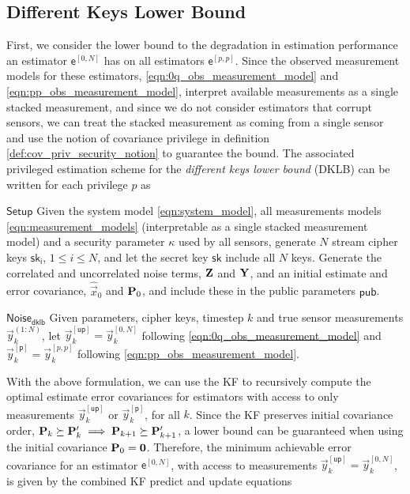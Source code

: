 \documentclass[conference]{IEEEtran}
\theoremstyle{definition}
\theoremstyle{remark}
\begin{document}
\subsection{Different Keys Lower Bound}\label{subsec:crypto_different_keys_lower_bound}
First, we consider the lower bound to the degradation in estimation performance an estimator $\mathsf{e}^{[0,N]}$ has on all estimators $\mathsf{e}^{[p,p]}$. Since the observed measurement models for these estimators, \eqref{eqn:0q_obs_measurement_model} and \eqref{eqn:pp_obs_measurement_model}, interpret available measurements as a single stacked measurement, and since we do not consider estimators that corrupt sensors, we can treat the stacked measurement as coming from a single sensor and use the notion of covariance privilege in definition \ref{def:cov_priv_security_notion} to guarantee the bound. The associated privileged estimation scheme for the \textit{different keys lower bound} (DKLB) can be written for each privilege $p$ as
\begin{LaTeXdescription}
  \item[$\mathsf{Setup}$] Given the system model \eqref{eqn:system_model}, all measurements models \eqref{eqn:measurement_models} (interpretable as a single stacked measurement model) and a security parameter $\kappa$ used by all sensors, generate $N$ stream cipher keys $\mathsf{sk_i}$, $1\leq i \leq N$, and let the secret key $\mathsf{sk}$ include all $N$ keys. Generate the correlated and uncorrelated noise terms, ${{\mathbf{Z}}}$ and ${{\mathbf{Y}}}$, and an initial estimate and error covariance, $\hat{\vec{x}}_0$ and ${{\mathbf{P}}}_0$, and include these in the public parameters $\mathsf{pub}$.
  
  \item[$\mathsf{Noise}_{\mathsf{dklb}}$] Given parameters, cipher keys, timestep $k$ and true sensor measurements $\vec{y}_k^{(1:N)}$, let $\vec{y}_k^{[\mathsf{up}]}=\vec{y}_k^{[0,N]}$ following \eqref{eqn:0q_obs_measurement_model} and $\vec{y}_k^{[\mathsf{p}]}=\vec{y}_k^{[p,p]}$ following \eqref{eqn:pp_obs_measurement_model}.
\end{LaTeXdescription}
With the above formulation, we can use the KF to recursively compute the optimal estimate error covariances for estimators with access to only measurements $\vec{y}_k^{[\mathsf{up}]}$ or $\vec{y}_k^{[\mathsf{p}]}$, for all $k$. Since the KF preserves initial covariance order, ${{\mathbf{P}}}_k \succeq {\ensuremath{{\mathbf{P}}}}_k^\prime \implies {\ensuremath{{\mathbf{P}}}}_{k+1} \succeq {\ensuremath{{\mathbf{P}}}}_{k+1}^\prime$, a lower bound can be guaranteed when using the initial covariance ${{\mathbf{P}}}_0={{\mathbf{0}}}$. Therefore, the minimum achievable error covariance for an estimator $\mathsf{e}^{[0,N]}$, with access to measurements $\vec{y}_k^{[\mathsf{up}]}=\vec{y}_k^{[0,N]}$, is given by the combined KF predict and update equations
\end{document}
